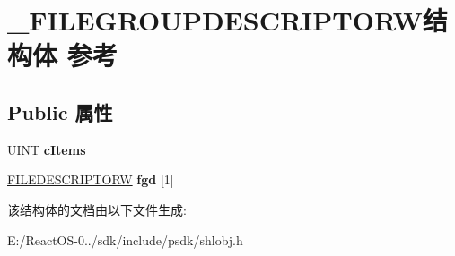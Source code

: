 \hypertarget{struct___f_i_l_e_g_r_o_u_p_d_e_s_c_r_i_p_t_o_r_w}{}\section{\+\_\+\+F\+I\+L\+E\+G\+R\+O\+U\+P\+D\+E\+S\+C\+R\+I\+P\+T\+O\+R\+W结构体 参考}
\label{struct___f_i_l_e_g_r_o_u_p_d_e_s_c_r_i_p_t_o_r_w}
\subsection*{Public 属性}
\begin{DoxyCompactItemize}
\item 
\mbox{\label{struct___f_i_l_e_g_r_o_u_p_d_e_s_c_r_i_p_t_o_r_w_a58ad3b54f79af870c23b9ff657c0f01d}} 
U\+I\+NT {\bfseries c\+Items}
\item 
\mbox{\label{struct___f_i_l_e_g_r_o_u_p_d_e_s_c_r_i_p_t_o_r_w_aa26b3108867319daef1af6725ca52c09}} 
\hyperlink{struct___f_i_l_e_d_e_s_c_r_i_p_t_o_r_w}{F\+I\+L\+E\+D\+E\+S\+C\+R\+I\+P\+T\+O\+RW} {\bfseries fgd} \mbox{[}1\mbox{]}
\end{DoxyCompactItemize}


该结构体的文档由以下文件生成\+:\begin{DoxyCompactItemize}
\item 
E\+:/\+React\+O\+S-\/0../sdk/include/psdk/shlobj.\+h\end{DoxyCompactItemize}
